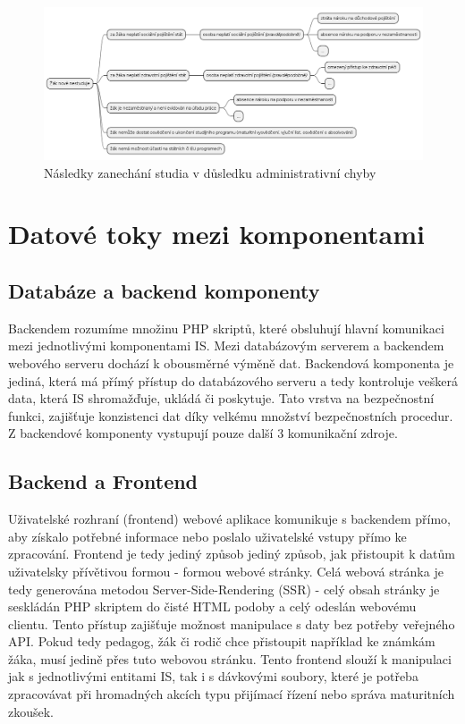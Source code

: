 \documentclass[FM,Proj]{tulthesis}
\begin{document}
\begin{landscape}
    \begin{figure}[H]
        \centering
        \includegraphics[width=\linewidth]{dusledky-nestudia.png}
        \caption{Následky zanechání studia v důsledku administrativní chyby}
        \label{fig:dusledky-nestudia}
    \end{figure}
\end{landscape}

\section{Datové toky mezi komponentami}
\label{section:datove-toky-mezi-komponentami}
\subsection*{Databáze a backend komponenty}
Backendem rozumíme množinu PHP skriptů, které obsluhují hlavní komunikaci mezi 
jednotlivými komponentami IS.
Mezi databázovým serverem a backendem webového serveru dochází k obousměrné výměně
dat. Backendová komponenta je jediná, která má přímý přístup do databázového serveru
a tedy kontroluje veškerá data, která IS shromažďuje, ukládá či poskytuje. Tato
vrstva na bezpečnostní funkci, zajišťuje konzistenci dat díky velkému množství
bezpečnostních procedur. Z backendové komponenty vystupují pouze další 3 komunikační
zdroje.

\subsection{Backend a Frontend}
\label{section:backend-a-frontend}
Uživatelské rozhraní (frontend) webové aplikace komunikuje s backendem přímo, aby získalo
potřebné informace nebo poslalo uživatelské vstupy přímo ke zpracování. Frontend je
tedy jediný způsob jediný způsob, jak přistoupit k datům uživatelsky přívětivou 
formou - formou webové stránky. Celá webová stránka je tedy generována metodou 
Server-Side-Rendering (SSR) - celý obsah stránky je seskládán
PHP skriptem do čisté HTML podoby a celý odeslán webovému clientu. Tento přístup zajišťuje
možnost manipulace s daty bez potřeby veřejného API. Pokud tedy pedagog, žák či 
rodič chce přistoupit například ke známkám žáka, musí jedině přes tuto webovou stránku.
Tento frontend slouží k manipulaci jak s jednotlivými entitami IS, tak i s dávkovými soubory,
které je potřeba zpracovávat při hromadných akcích typu přijímací řízení nebo správa 
maturitních zkoušek.
\end{document}

